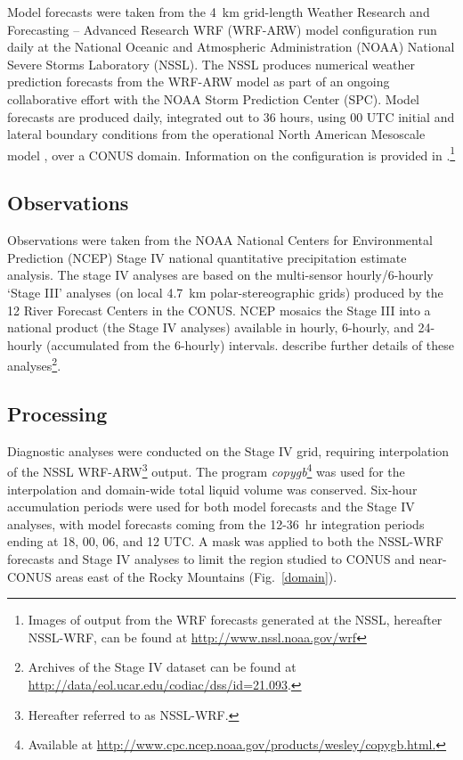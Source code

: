 Model forecasts were taken from the \mbox{4 km} grid-length Weather Research and Forecasting -- Advanced Research WRF (WRF-ARW) model configuration \citep{WRFV3} run daily at the National Oceanic and Atmospheric Administration (NOAA) National Severe Storms Laboratory (NSSL).
The NSSL produces numerical weather prediction forecasts from the WRF-ARW model as part of an ongoing collaborative effort with the NOAA Storm Prediction Center (SPC).
Model forecasts are produced daily, integrated out to 36 hours, using 00 UTC initial and lateral boundary conditions from the operational North American Mesoscale model \citep{NAMnWRF-NMM}, over a CONUS domain.
Information on the configuration is provided in \cite{Kain2010}.\footnote{Images of output from the WRF forecasts generated at the NSSL, hereafter NSSL-WRF, can be found at \url{http://www.nssl.noaa.gov/wrf}}




\subsection{Observations}
\label{observations}

Observations were taken from the NOAA National Centers for Environmental Prediction (NCEP) Stage IV national quantitative precipitation estimate analysis.
The stage IV analyses are based on the multi-sensor hourly/6-hourly `Stage III' analyses (on local \mbox{4.7 km} polar-stereographic grids) produced by the 12 River Forecast Centers in the CONUS.
NCEP mosaics the Stage III into a national product (the Stage IV analyses) available in hourly, 6-hourly, and 24-hourly (accumulated from the 6-hourly) intervals.
\cite{StageIV} describe further details of these analyses\footnote{Archives of the Stage IV dataset can be found at \url{http://data/eol.ucar.edu/codiac/dss/id=21.093}.}.




\subsection{Processing}
\label{dprocessing}

Diagnostic analyses were conducted on the Stage IV grid, requiring interpolation of the NSSL WRF-ARW\footnote{Hereafter referred to as NSSL-WRF.} output.
The program \emph{copygb}\footnote{Available at \url{http://www.cpc.ncep.noaa.gov/products/wesley/copygb.html.}} was used for the interpolation and domain-wide total liquid volume was conserved.
Six-hour accumulation periods were used for both model forecasts and the Stage IV analyses, with model forecasts coming from the \mbox{12-36 hr} integration periods ending at 18, 00, 06, and 12 UTC.
A mask was applied to both the NSSL-WRF forecasts and Stage IV analyses to limit the region studied to CONUS and near-CONUS areas east of the Rocky Mountains \mbox{(Fig. \ref{domain})}.


